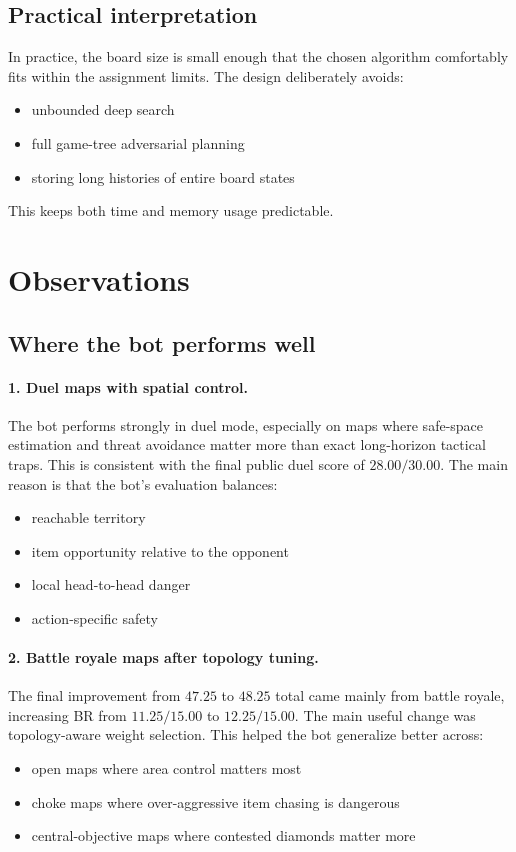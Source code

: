 \documentclass[11pt,a4paper]{article}
\begin{document}
\subsection{Practical interpretation}
In practice, the board size is small enough that the chosen algorithm comfortably fits within the assignment limits. The design deliberately avoids:
\begin{itemize}[leftmargin=*]
    \item unbounded deep search
    \item full game-tree adversarial planning
    \item storing long histories of entire board states
\end{itemize}

This keeps both time and memory usage predictable.

\section{Observations}
\subsection{Where the bot performs well}
\paragraph{1. Duel maps with spatial control.}
The bot performs strongly in duel mode, especially on maps where safe-space estimation and threat avoidance matter more than exact long-horizon tactical traps. This is consistent with the final public duel score of \(28.00/30.00\). The main reason is that the bot's evaluation balances:
\begin{itemize}[leftmargin=*]
    \item reachable territory
    \item item opportunity relative to the opponent
    \item local head-to-head danger
    \item action-specific safety
\end{itemize}

\paragraph{2. Battle royale maps after topology tuning.}
The final improvement from \(47.25\) to \(48.25\) total came mainly from battle royale, increasing BR from \(11.25/15.00\) to \(12.25/15.00\). The main useful change was topology-aware weight selection. This helped the bot generalize better across:
\begin{itemize}[leftmargin=*]
    \item open maps where area control matters most
    \item choke maps where over-aggressive item chasing is dangerous
    \item central-objective maps where contested diamonds matter more
\end{itemize}
\end{document}
